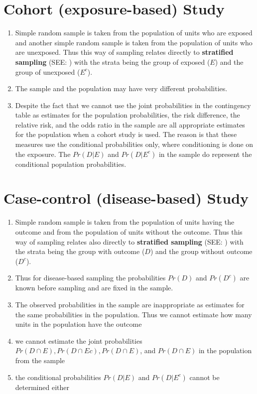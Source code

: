 \section{Cohort (exposure-based) Study \cite{ism-1}} \label{Cohort (exposure-based) Study}

\begin{enumerate}
    \item Simple random sample is taken from the population of units who are exposed and another simple random sample is taken from the population of units who are unexposed. Thus this way of sampling relates directly to \textbf{stratified sampling} (SEE: ) with the strata being the group of exposed ($E$) and the group of unexposed ($E^c$).
    
    \item The sample and the population may have very different probabilities.

    \item Despite the fact that we cannot use the joint probabilities in the contingency table as estimates for the population probabilities, the risk difference, the relative risk, and the odds ratio in the sample are all appropriate estimates for the population when a cohort study is used. The reason is that these measures use the conditional probabilities only, where conditioning is done on the exposure. The $Pr(D|E)$ and $Pr(D|E^c)$ in the sample do represent the conditional population probabilities.
\end{enumerate}


\section{Case-control (disease-based) Study \cite{ism-1}} \label{Case-control (disease-based) Study}

\begin{enumerate}
    \item Simple random sample is taken from the population of units having the outcome and from the population of units without the outcome. Thus this way of sampling relates also directly to \textbf{stratified sampling} (SEE: ) with the strata being the group with outcome ($D$) and the group without outcome ($D^c$). 

    \item Thus for disease-based sampling the probabilities $Pr(D)$ and $Pr(D^c)$ are known before sampling and are fixed in the sample.

    \item The observed probabilities in the sample are inappropriate as estimates for the same probabilities in the population. Thus we cannot estimate how many units in the population have the outcome

    \item we cannot estimate the joint probabilities $Pr(D \cap E), Pr(D \cap Ec), Pr(D \cap E)$, and $Pr(D \cap E)$ in the population from the sample

    \item the conditional probabilities $Pr(D|E)$ and $Pr(D|E^c)$ cannot be determined either
\end{enumerate}


